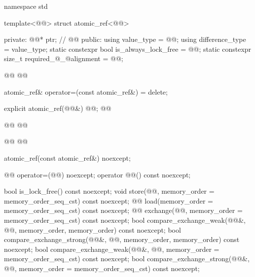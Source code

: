 \begin{codeblock}
namespace std {
  template<@@> struct atomic_ref<@@> {
  private:
    @@* ptr;  // \expos
    @@
  public:
    using value_type = @@;
    using difference_type = value_type;
    static constexpr bool is_always_lock_free = @@;
    static constexpr size_t required_@_@alignment = @@;

    @@
    @@

    atomic_ref& operator=(const atomic_ref&) = delete;

    explicit atomic_ref(@@&) @@;
    @@
    
    @@
    @@
    
    @@
    @@

    atomic_ref(const atomic_ref&) noexcept;

    @@ operator=(@@) noexcept;
    operator @@() const noexcept;

    bool is_lock_free() const noexcept;
    void store(@@, memory_order = memory_order_seq_cst) const noexcept;
    @@ load(memory_order = memory_order_seq_cst) const noexcept;
    @@ exchange(@@,
                            memory_order = memory_order_seq_cst) const noexcept;
    bool compare_exchange_weak(@@&, @@,
                               memory_order, memory_order) const noexcept;
    bool compare_exchange_strong(@@&, @@,
                                 memory_order, memory_order) const noexcept;
    bool compare_exchange_weak(@@&, @@,
                               memory_order = memory_order_seq_cst) const noexcept;
    bool compare_exchange_strong(@@&, @@,
                                 memory_order = memory_order_seq_cst) const noexcept;

}}
\end{codeblock}
